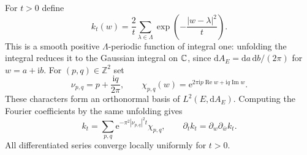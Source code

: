 For $t>0$ define
\begin{equation}\label{eq:hopf-heat}
 k_t(w)=\frac2t\sum_{\lambda\in\Lambda}
                 \exp\left(-\frac{|w-\lambda|^2}{t}\right).
\end{equation}
This is a smooth positive $\Lambda$-periodic function of integral one: unfolding the integral reduces it to the Gaussian integral on $\mathbb C$, since $\mathrm{d}A_E=\mathrm{d}a\,\mathrm{d}b/(2\pi)$ for $w=a+\mathrm ib$.
For $(p,q)\in\mathbb Z^2$ set
\[
 \nu_{p,q}=p+\frac{\mathrm iq}{2\pi},\qquad
 \chi_{p,q}(w)=\mathrm{e}^{2\pi\mathrm ip\operatorname{Re}w+
                         \mathrm iq\operatorname{Im}w}.
\]
These characters form an orthonormal basis of $L^2(E,\mathrm{d}A_E)$. Computing the Fourier coefficients by the same unfolding gives
\begin{equation}\label{eq:hopf-heat-fourier}
 k_t=\sum_{p,q}\mathrm{e}^{-\pi^2|\nu_{p,q}|^2t}\chi_{p,q},
 \qquad \partial_tk_t=\partial_w\partial_{\bar w}k_t.
\end{equation}
All differentiated series converge locally uniformly for $t>0$.

